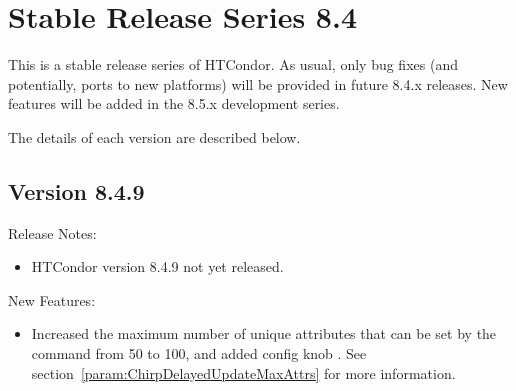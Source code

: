 
\section{\label{sec:History-8-4}Stable Release Series 8.4}

This is a stable release series of HTCondor.
As usual, only bug fixes (and potentially, ports to new platforms)
will be provided in future 8.4.x releases.
New features will be added in the 8.5.x development series.

The details of each version are described below.

\subsection*{\label{sec:New-8-4-9}Version 8.4.9}

\noindent Release Notes:

\begin{itemize}

\item HTCondor version 8.4.9 not yet released.

\end{itemize}


\noindent New Features:

\begin{itemize}

\item Increased the maximum number of unique attributes that can be 
set by the  command  from
50 to 100, and added config knob .
See section~\ref{param:ChirpDelayedUpdateMaxAttrs} for more information.

\end{itemize}

